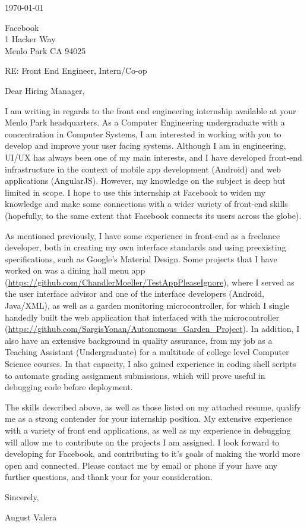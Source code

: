 \documentclass[11pt]{article}
\author{August Valera}
\begin{document}

\today

\vspace{12pt}
Facebook \\
1 Hacker Way \\
Menlo Park CA 94025

\vspace{12pt}

RE: Front End Engineer, Intern/Co-op

\vspace{12pt}
Dear Hiring Manager,

\vspace{12pt}
I am writing in regards to the front end engineering internship available at
your Menlo Park headquarters. As a Computer Engineering undergraduate with a
concentration in Computer Systems, I am interested in working with you to
develop and improve your user facing systems. Although I am in engineering,
UI/UX has always been one of my main interests, and I have developed front-end
infrastructure in the context of mobile app development (Android) and web
applications (AngularJS). However, my knowledge on the subject is deep but
limited in scope. I hope to use this internship at Facebook to widen my
knowledge and make some connections with a wider variety of front-end skills
(hopefully, to the same extent that Facebook connects its users across the
globe).

As mentioned previously, I have some experience in front-end as a freelance
developer, both in creating my own interface standards and using preexisting
specifications, such as Google's Material Design. Some projects that I have
worked on was a dining hall menu app
(\url{https://github.com/ChandlerMoeller/TestAppPleaseIgnore}), where I served
as the user interface advisor and one of the interface developers (Android,
Java/XML), as well as a garden monitoring microcontroller, for which I single
handedly built the web application that interfaced with the microcontroller
(\url{https://github.com/SargisYonan/Autonomous_Garden_Project}). In addition, I
also have an extensive background in quality assurance, from my job as a
Teaching Assistant (Undergraduate) for a multitude of college level Computer
Science courses. In that capacity, I also gained experience in coding shell
scripts to automate grading assignment submissions, which will prove useful in
debugging code before deployment.

The skills described above, as well as those listed on my attached resume,
qualify me as a strong contender for your internship position. My extensive
experience with a variety of front end applications, as well as my experience in
debugging will allow me to contribute on the projects I am assigned. I look
forward to developing for Facebook, and contributing to it's goals of making the
world more open and connected. Please contact me by email or phone if your have
any further questions, and thank your for your consideration.

\vspace{12pt}
Sincerely,

\vspace{24pt}
August Valera
\end{document}
